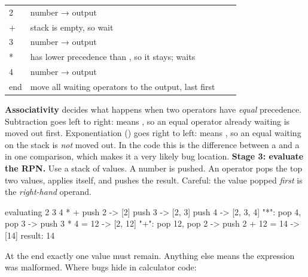 \documentclass[10pt,a4paper]{article}
\begin{document}
\begin{datatable}{}{\small}
\begin{xltabular}{\linewidth}{@{}Y{0.43}Y{2.69}Y{0.46}Y{0.42}@{}}
 &  &  &  \\ \hline
{} & number → output &  &  \\
+ & stack is empty, so wait &  & \code{+} \\
3 & number → output &  & \code{+} \\
* & \code{+} has lower precedence than \code{*}, so it stays; \code{*} waits &  & \code{+\ *} \\
4 & number → output &  & \code{+\ *} \\
end & move all waiting operators to the output, last first &  &  \\
\hline
\end{xltabular}
\end{datatable}
\textbf{Associativity} decides what happens when two operators have \emph{equal} precedence. Subtraction goes left to right:  means , so an equal operator already waiting is moved out first. Exponentiation (\code{\textasciicircum{}}) goes right to left:  means , so an equal \code{\textasciicircum{}} waiting on the stack is \emph{not} moved out. In the code this is the difference between a \code{\textgreater{}\allowbreak{}} and a \code{\textgreater{}\allowbreak{}=\allowbreak{}} in one comparison, which makes it a very likely bug location.
\textbf{Stage 3: evaluate the RPN.} Use a stack of values. A number is pushed. An operator pops the top two values, applies itself, and pushes the result. Careful: the value popped \emph{first} is the \emph{right-hand} operand.
\begin{txtcode}
evaluating  2 3 4 * +
  push 2              -> [2]
  push 3              -> [2, 3]
  push 4              -> [2, 3, 4]
  "*": pop 4, pop 3   -> push 3 * 4 = 12  -> [2, 12]
  "+": pop 12, pop 2  -> push 2 + 12 = 14 -> [14]
result: 14
\end{txtcode}
At the end exactly one value must remain. Anything else means the expression was malformed.
Where bugs hide in calculator code:
\end{document}
